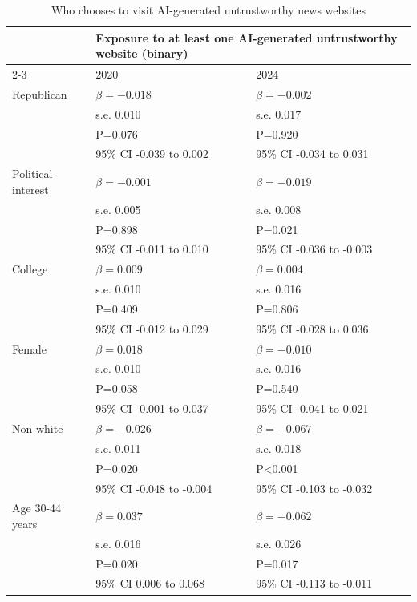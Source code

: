 \begin{table}[H]
\centering
\caption{Who chooses to visit AI-generated untrustworthy news websites}
\label{tab:sm_ai_model}
\begin{tabular}{lll}
\hline
 & \multicolumn{2}{l}{Exposure to at least one AI-generated untrustworthy website (binary)} \\ 
\cline{2-3}
 & 2020 & 2024 \\ 
\hline
\rowcolor[gray]{0.93}
Republican & $\beta=-0.018$ & $\beta=-0.002$ \\ 
\rowcolor[gray]{0.93}
 & s.e. 0.010 & s.e. 0.017 \\ 
\rowcolor[gray]{0.93}
 & P=0.076 & P=0.920 \\ 
\rowcolor[gray]{0.93}
 & 95\% CI -0.039 to 0.002 & 95\% CI -0.034 to 0.031 \\ 
Political interest & $\beta=-0.001$ & $\beta=-0.019$ \\ 
 & s.e. 0.005 & s.e. 0.008 \\ 
 & P=0.898 & P=0.021 \\ 
 & 95\% CI -0.011 to 0.010 & 95\% CI -0.036 to -0.003 \\ 
\rowcolor[gray]{0.93}
College & $\beta=0.009$ & $\beta=0.004$ \\ 
\rowcolor[gray]{0.93}
 & s.e. 0.010 & s.e. 0.016 \\ 
\rowcolor[gray]{0.93}
 & P=0.409 & P=0.806 \\ 
\rowcolor[gray]{0.93}
 & 95\% CI -0.012 to 0.029 & 95\% CI -0.028 to 0.036 \\ 
Female & $\beta=0.018$ & $\beta=-0.010$ \\ 
 & s.e. 0.010 & s.e. 0.016 \\ 
 & P=0.058 & P=0.540 \\ 
 & 95\% CI -0.001 to 0.037 & 95\% CI -0.041 to 0.021 \\ 
\rowcolor[gray]{0.93}
Non-white & $\beta=-0.026$ & $\beta=-0.067$ \\ 
\rowcolor[gray]{0.93}
 & s.e. 0.011 & s.e. 0.018 \\ 
\rowcolor[gray]{0.93}
 & P=0.020 & P<0.001 \\ 
\rowcolor[gray]{0.93}
 & 95\% CI -0.048 to -0.004 & 95\% CI -0.103 to -0.032 \\ 
Age 30-44 years & $\beta=0.037$ & $\beta=-0.062$ \\ 
 & s.e. 0.016 & s.e. 0.026 \\ 
 & P=0.020 & P=0.017 \\ 
 & 95\% CI 0.006 to 0.068 & 95\% CI -0.113 to -0.011 \\ 

\end{tabular}
\end{table}
